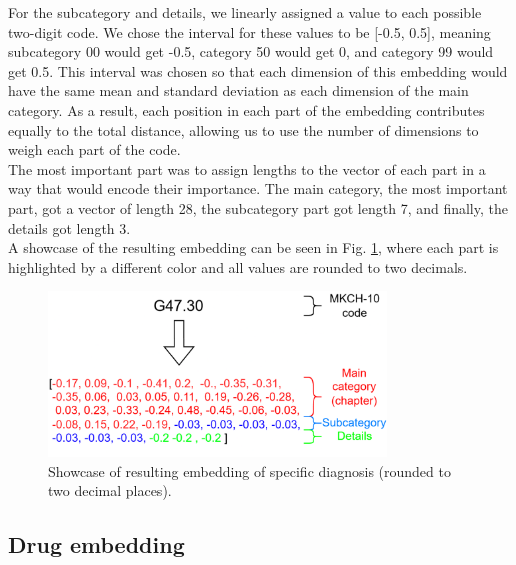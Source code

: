 For the subcategory and details, we linearly assigned a value to each possible two-digit code. We chose the interval for these values to be [-0.5, 0.5], meaning subcategory 00 would get -0.5, category 50 would get 0, and category 99 would get 0.5. This interval was chosen so that each dimension of this embedding would have the same mean and standard deviation as each dimension of the main category. As a result, each position in each part of the embedding contributes equally to the total distance, allowing us to use the number of dimensions to weigh each part of the code.
\\

The most important part was to assign lengths to the vector of each part in a way that would encode their importance. The main category, the most important part, got a vector of length 28, the subcategory part got length 7, and finally, the details got length 3.
\\

A showcase of the resulting embedding can be seen in Fig. \ref{fig:diag_emb_show}, where each part is highlighted by a different color and all values are rounded to two decimals.

\begin{figure}[!h]
	\centering
	
	\includegraphics[width=0.8\textwidth]{images/diagnosis_embed_showcase.png} 
	
	\caption{Showcase of resulting embedding of specific diagnosis (rounded to two decimal places).}
	\label{fig:diag_emb_show}
\end{figure} 


\subsection{Drug embedding}

